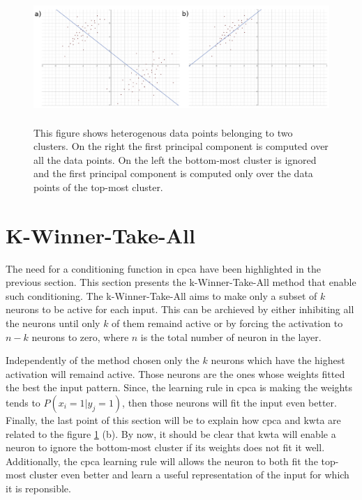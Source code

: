 \documentclass[11pt]{report}
\begin{document}
\begin{figure}[h]
\centering
\includegraphics[width=15cm, height=5cm]{heterogeneous_data}
\caption{This figure shows heterogenous data points belonging to two clusters. On the right the first principal component is computed over all the data points. On the left the bottom-most cluster is ignored and the first principal component is computed only over the data points of the top-most cluster.}
\label{fig:heterogeneous_data}
\end{figure}

\section{K-Winner-Take-All} \label{sec:kwta}

The need for a conditioning function in \acrshort{cpca} have been highlighted in the previous section. This section presents the k-Winner-Take-All method that enable such conditioning. The k-Winner-Take-All aims to make only a subset of $k$ neurons to be active for each input. This can be archieved by either inhibiting all the neurons until only $k$ of them remaind active or by forcing the activation to $n - k$ neurons to zero, where $n$ is the total number of neuron in the layer.\newline

Independently of the method chosen only the $k$ neurons which have the highest activation will remaind active. Those neurons are the ones whose weights fitted the best the input pattern. Since, the learning rule in \acrshort{cpca} is making the weights tends to $P(x_i = 1 | y_j = 1)$, then those neurons will fit the input even better. Finally, the last point of this section will be to explain how \acrshort{cpca} and \acrshort{kwta} are related to the figure \ref{fig:heterogeneous_data} (b). By now, it should be clear that \acrshort{kwta} will enable a neuron to ignore the bottom-most cluster if its weights does not fit it well. Additionally, the \acrshort{cpca} learning rule will allows the neuron to both fit the top-most cluster even better and learn a useful representation of the input for which it is reponsible.
\end{document}

